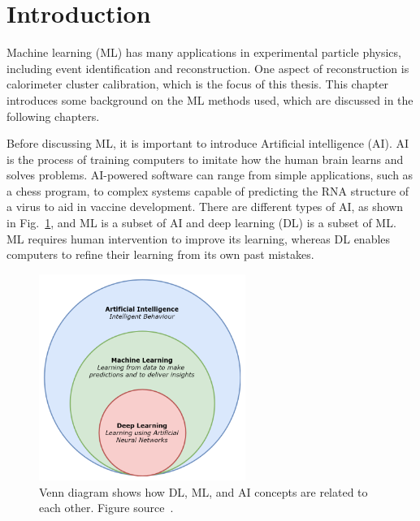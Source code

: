
\section{Introduction}
Machine learning (ML) has many applications in experimental particle physics, including event identification and reconstruction.
One aspect of reconstruction is calorimeter cluster calibration, which is the focus of this thesis.
This chapter introduces some background on the ML methods used, which are discussed in the following chapters. %

Before discussing ML, it is important to introduce Artificial intelligence (AI).
AI is the process of training computers to imitate how the human brain learns and solves problems.
AI-powered software can range from simple applications, such as a chess program, to complex systems capable of predicting the RNA structure of a virus to aid in vaccine development.
There are different types of AI, as shown in Fig.~\ref{fig:ML_diagram}, and ML is a subset of AI and deep learning (DL) is a subset of ML.
ML requires human intervention to improve its learning, whereas DL enables computers to refine their learning from its own past mistakes.

\begin{figure}[t!]
\centering
\includegraphics[width=0.60\textwidth]{figures/ML_subsections.png}
\caption[Diagram of AI subsections]{Venn diagram shows how DL, ML, and AI concepts are related to each other. Figure source~\cite{ML_diagram}.}
\label{fig:ML_diagram}
\end{figure}

